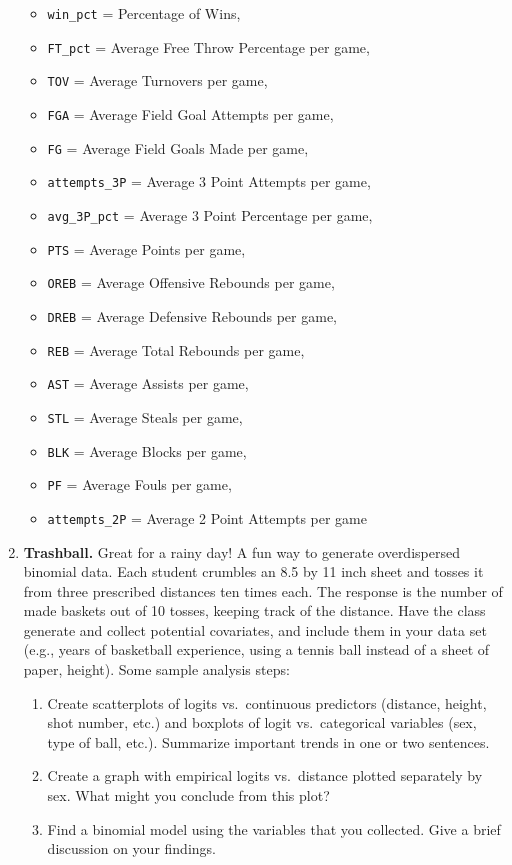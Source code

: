 \documentclass[
]{krantz}
\providecommand{\tightlist}{%
  \setlength{\itemsep}{0pt}\setlength{\parskip}{0pt}}
\begin{document}
\begin{enumerate}
  \begin{itemize}
  \tightlist
  \item
    \texttt{win\_pct} = Percentage of Wins,
  \item
    \texttt{FT\_pct} = Average Free Throw Percentage per game,
  \item
    \texttt{TOV} = Average Turnovers per game,
  \item
    \texttt{FGA} = Average Field Goal Attempts per game,
  \item
    \texttt{FG} = Average Field Goals Made per game,
  \item
    \texttt{attempts\_3P} = Average 3 Point Attempts per game,
  \item
    \texttt{avg\_3P\_pct} = Average 3 Point Percentage per game,
  \item
    \texttt{PTS} = Average Points per game,
  \item
    \texttt{OREB} = Average Offensive Rebounds per game,
  \item
    \texttt{DREB} = Average Defensive Rebounds per game,
  \item
    \texttt{REB} = Average Total Rebounds per game,
  \item
    \texttt{AST} = Average Assists per game,
  \item
    \texttt{STL} = Average Steals per game,
  \item
    \texttt{BLK} = Average Blocks per game,
  \item
    \texttt{PF} = Average Fouls per game,
  \item
    \texttt{attempts\_2P} = Average 2 Point Attempts per game
  \end{itemize}
\item
  \textbf{Trashball.} Great for a rainy day! A fun way to generate overdispersed binomial data. Each student crumbles an 8.5 by 11 inch sheet and tosses it from three prescribed distances ten times each. The response is the number of made baskets out of 10 tosses, keeping track of the distance. Have the class generate and collect potential covariates, and include them in your data set (e.g., years of basketball experience, using a tennis ball instead of a sheet of paper, height). Some sample analysis steps:

  \begin{enumerate}
  \def\labelenumii{\alph{enumii}.}
  \tightlist
  \item
    Create scatterplots of logits vs.~continuous predictors (distance, height, shot number, etc.) and boxplots of logit vs.~categorical variables (sex, type of ball, etc.). Summarize important trends in one or two sentences.
  \item
    Create a graph with empirical logits vs.~distance plotted separately by sex. What might you conclude from this plot?
  \item
    Find a binomial model using the variables that you collected. Give a brief discussion on your findings.
  \end{enumerate}
\end{enumerate}
\end{document}

